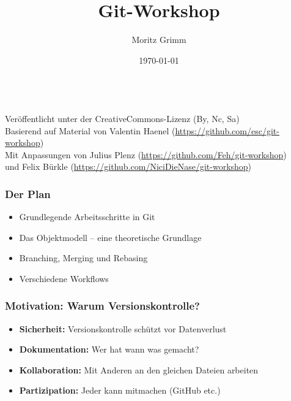 \documentclass{beamer}
\date{\today}
\begin{document}

\begin{frame}
		\title{Git-Workshop}
		\author{Moritz Grimm}
		\date{}
		\titlepage
		\begin{center}
			\\
			\vspace{0.4cm}
			\tiny{Veröffentlicht unter der CreativeCommons-Lizenz (By, Nc, Sa)}\\
			\vspace{0.2cm}
			\tiny{Basierend auf Material von Valentin Haenel (\url{https://github.com/esc/git-workshop})}\\
			\vspace{0.2cm}
			\tiny{Mit Anpassungen von Julius Plenz (\url{https://github.com/Feh/git-workshop})}\\
			\vspace{0.2cm}
			\tiny{und Felix Bürkle (\url{https://github.com/NiciDieNase/git-workshop})}
		\end{center}
\end{frame}
\begin{frame}
\frametitle{Der Plan}

\begin{itemize}
	\item Grundlegende Arbeitsschritte in Git
	\item Das Objektmodell -- eine theoretische Grundlage
	\item Branching, Merging und Rebasing
	\item Verschiedene Workflows
\end{itemize}

\end{frame}
\begin{frame}
\frametitle{Motivation: Warum Versionskontrolle?}

\begin{itemize}
	\item \textbf{Sicherheit:} Versionskontrolle schützt vor Datenverlust
	\item \textbf{Dokumentation:} Wer hat wann was gemacht?
	\item \textbf{Kollaboration:} Mit Anderen an den gleichen Dateien arbeiten
	\item \textbf{Partizipation:} Jeder kann mitmachen (GitHub etc.)
\end{itemize}

\end{frame}
\end{document}
